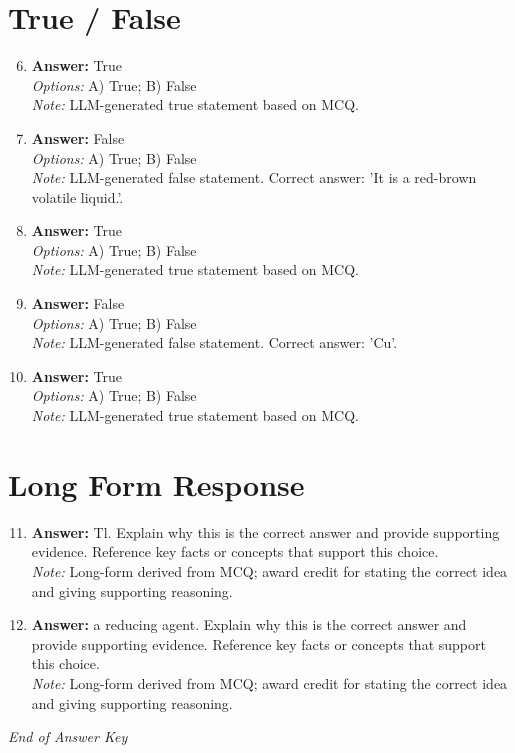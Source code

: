 \documentclass[12pt]{article}
\begin{document}
\section*{True / False}
\begin{enumerate}[label=\arabic*.]
\setcounter{enumi}{5}
\item \textbf{Answer:} True
\\ \textit{Options:} A) True; B) False
\\ \textit{Note:} LLM-generated true statement based on MCQ.
\item \textbf{Answer:} False
\\ \textit{Options:} A) True; B) False
\\ \textit{Note:} LLM-generated false statement. Correct answer: 'It is a red-brown volatile liquid.'.
\item \textbf{Answer:} True
\\ \textit{Options:} A) True; B) False
\\ \textit{Note:} LLM-generated true statement based on MCQ.
\item \textbf{Answer:} False
\\ \textit{Options:} A) True; B) False
\\ \textit{Note:} LLM-generated false statement. Correct answer: 'Cu'.
\item \textbf{Answer:} True
\\ \textit{Options:} A) True; B) False
\\ \textit{Note:} LLM-generated true statement based on MCQ.
\end{enumerate}

\section*{Long Form Response}
\begin{enumerate}[label=\arabic*.]
\setcounter{enumi}{10}
\item \textbf{Answer:} Tl. Explain why this is the correct answer and provide supporting evidence. Reference key facts or concepts that support this choice.
\\ \textit{Note:} Long-form derived from MCQ; award credit for stating the correct idea and giving supporting reasoning.
\item \textbf{Answer:} a reducing agent. Explain why this is the correct answer and provide supporting evidence. Reference key facts or concepts that support this choice.
\\ \textit{Note:} Long-form derived from MCQ; award credit for stating the correct idea and giving supporting reasoning.
\end{enumerate}

\vfill
\noindent\textit{End of Answer Key}
\end{document}
